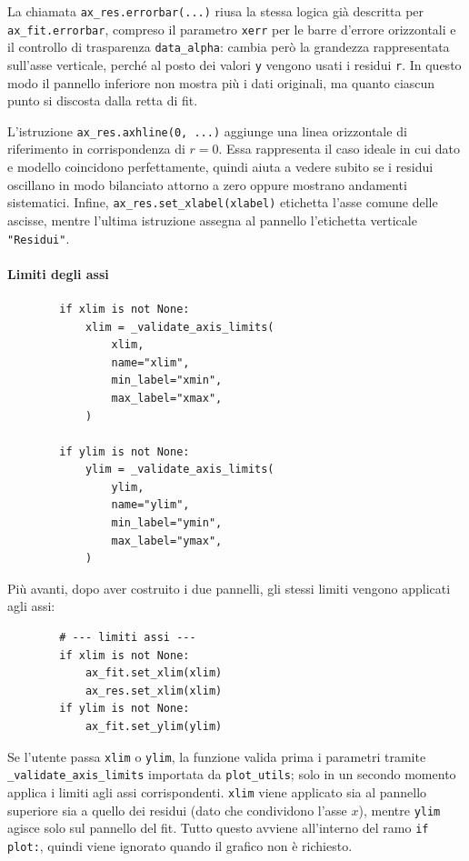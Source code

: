 La chiamata \texttt{ax\_res.errorbar(...)} riusa la stessa logica già descritta per \texttt{ax\_fit.errorbar}, compreso il parametro \texttt{xerr} per le barre d'errore orizzontali e il controllo di trasparenza \texttt{data\_alpha}: cambia però la grandezza rappresentata sull'asse verticale, perché al posto dei valori \texttt{y} vengono usati i residui \texttt{r}. In questo modo il pannello inferiore non mostra più i dati originali, ma quanto ciascun punto si discosta dalla retta di fit.

L'istruzione \texttt{ax\_res.axhline(0, ...)} aggiunge una linea orizzontale di riferimento in corrispondenza di \(r = 0\). Essa rappresenta il caso ideale in cui dato e modello coincidono perfettamente, quindi aiuta a vedere subito se i residui oscillano in modo bilanciato attorno a zero oppure mostrano andamenti sistematici. Infine, \texttt{ax\_res.set\_xlabel(xlabel)} etichetta l'asse comune delle ascisse, mentre l'ultima istruzione assegna al pannello l'etichetta verticale \texttt{"Residui"}.

\paragraph{Limiti degli assi}
\begin{verbatim}
        if xlim is not None:
            xlim = _validate_axis_limits(
                xlim,
                name="xlim",
                min_label="xmin",
                max_label="xmax",
            )

        if ylim is not None:
            ylim = _validate_axis_limits(
                ylim,
                name="ylim",
                min_label="ymin",
                max_label="ymax",
            )
\end{verbatim}

Pi\`u avanti, dopo aver costruito i due pannelli, gli stessi limiti vengono applicati agli assi:

\begin{verbatim}
        # --- limiti assi ---
        if xlim is not None:
            ax_fit.set_xlim(xlim)
            ax_res.set_xlim(xlim)
        if ylim is not None:
            ax_fit.set_ylim(ylim)
\end{verbatim}

Se l'utente passa \texttt{xlim} o \texttt{ylim}, la funzione valida prima i parametri tramite \texttt{\_validate\_axis\_limits} importata da \texttt{plot\_utils}; solo in un secondo momento applica i limiti agli assi corrispondenti. \texttt{xlim} viene applicato sia al pannello superiore sia a quello dei residui (dato che condividono l'asse $x$), mentre \texttt{ylim} agisce solo sul pannello del fit. Tutto questo avviene all'interno del ramo \texttt{if plot:}, quindi viene ignorato quando il grafico non è richiesto.

